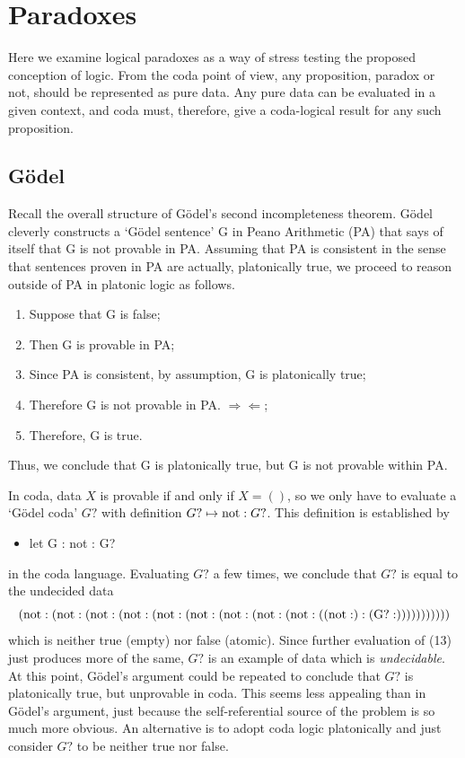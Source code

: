 \documentclass[11pt]{article}
\begin{document}
\section{Paradoxes}

     Here we examine logical paradoxes as a way of stress testing the proposed conception of logic.
From the coda point of view, any proposition, paradox or not, should be represented as pure data.
Any pure data can be evaluated in a given context, and coda must, therefore, give a coda-logical result for 
any such proposition.

\subsection{G\"{o}del}

Recall the overall structure of G\"{o}del's second incompleteness theorem\cite{Godel}.  G\"{o}del cleverly constructs a `G\"{o}del sentence' G
in Peano Arithmetic (PA) that says of itself that G is not provable in PA.  Assuming that PA is consistent in the sense
that sentences proven in PA are actually, platonically true, we proceed to reason outside of PA in platonic logic as follows.
\begin{enumerate}
\item Suppose that G is false;
\item Then G is provable in PA;
\item Since PA is consistent, by assumption, G is platonically true;
\item Therefore G is not provable in PA.  $\Rightarrow\!\Leftarrow$;
\item Therefore, G is true.
\end{enumerate}
Thus, we conclude that G is platonically true, but G is not provable within PA.

In coda, data $X$ is provable if and only if $X=()$, so we only have to evaluate a `G\"{o}del coda' $G?$
with definition $G?\mapsto {\rm not}:G?$.   This definition is established by
\begin{itemize}
\item let G : not : G?
\end{itemize}
in the coda language.
Evaluating $G?$ a few times, we conclude that $G?$ is equal to the undecided data
\begin{equation}\label{eqn}
{\rm (not:(not:(not:(not:(not:(not:(not:(not:(not:(({not}:):({G?}:)))))))))))}
\end{equation}
which is neither true (empty) nor false (atomic).
Since further evaluation of (13) just produces more of the same, $G?$ is an example of data which is {\it undecidable}.   At this point,
G\"{o}del's argument could be repeated to conclude that $G?$ is platonically true, but unprovable in coda.  This seems less
appealing than in G\"odel's argument, just because the self-referential source of the problem is so much more obvious.  An alternative
is to adopt coda logic platonically and just consider $G?$ to be neither true nor false.
\end{document}
